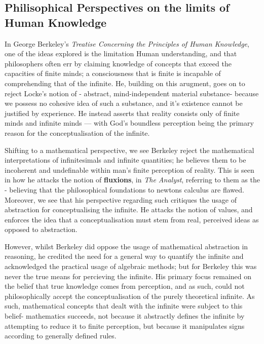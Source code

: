 \documentclass[openany,oneside,12pt,hidelinks]{book}
\begin{document}
\subsection{Philisophical Perspectives on the limits of Human Knowledge}

In George Berkeley's \emph{Treatise Concerning the Principles of Human
  Knowledge}, one of the ideas explored is the limitation Human understanding, and that philosophers often err by claiming knowledge of concepts that exceed the capacities of finite minds; a consciousness that is finite is
incapable of comprehending that of the infinite. He, building on this arugment, goes on to reject Locke's notion of - abstract, mind-independent material substance- because we possess no cohesive idea of such a substance, and it's existence cannot be justified by experience.
He instead asserts that reality consists only of finite minds and infinite minds --- with God's boundless perception being the primary reason for the conceptualisation of the infinite.

Shifting to a mathematical perspective, we see Berkeley reject the
mathematical interpretations of infinitesimals and infinite quantities; he
believes them to be incoherent and undefinable within man's finite perception
of reality. This is seen in how he attacks the notion of \textbf{fluxions}, in \emph{The Analyst}, referring to them as the - believing that the philosophical foundations to newtons calculus are flawed.
Moreover, we see that his perspective regarding such critiques the usage of abstraction for conceptualising the infinite. He attacks the notion of  values, and enforces the idea that a conceptualisation must stem from real, perceived ideas as opposed to abstraction.

However, whilst Berkeley did oppose the usage of mathematical
abstraction in reasoning, he credited the need for a general way to quantify the infinite and acknowledged the practical usage of algebraic methods; but for Berkeley this was never the true means for percieving the infinite. His primary focus remained on the belief that true knowledge comes from perception, and as such, could not philosophically accept the conceptualisation of the purely theoretical infinite.
As such, mathematical concepts that dealt with the infinite were subject to this
belief- mathematics succeeds, not because it abstractly defines the infinite by attempting to reduce it to finite perception, but because it manipulates signs according to generally defined rules.
\end{document}
